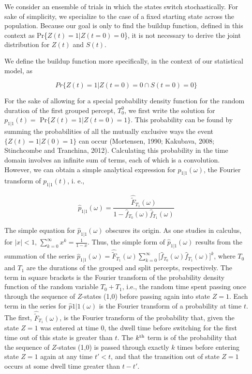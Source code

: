 We consider an ensemble of trials in which the states switch stochastically. For sake of simplicity, we specialize to the case of a fixed starting state across the population. Because our goal is only to find the buildup function, defined in this context as Pr\{$Z(t)=1|Z(t=0)=0$\}, it is not necessary to derive the joint distribution for $Z(t)$ and $S(t)$.

We define the buildup function more specifically, in the context of our statistical model, as

\begin{equation}
Pr\{Z(t) = 1 | Z(t = 0) = 0 \cap S(t = 0) = 0\}
\label{eqn:BUF}
\end{equation}

For the sake of allowing for a special probability density function for the random duration of the first grouped percept, $T_0^0$, we first write the solution for $p_{1|1}(t)=$ Pr$\{Z(t)=1|Z(t=0)=1\}$. This probability can be found by summing the probabilities of all the mutually exclusive ways the event $\{Z(t)=1|Z(0)=1\}$  can occur (Mortensen, 1990; Kakubava, 2008; Stinchcombe and Tranchina, 2012). Calculating this probability in the time domain involves an infinite sum of terms, each of which is a convolution. However, we can obtain a simple analytical expression for $\hat{p}_{1|1} (\omega)$, the Fourier transform of $p_{1|1} (t)$, i. e.,

\begin{equation}{}
\hat{p}_{1|1}(\omega) = \frac{\hat{\tilde{F}}_{T_1}(\omega)}{1-\hat{f}_{T_0}(\omega)\hat{f}_{T_1}(\omega)}
\label{eqn:analBUF1}
\end{equation}

The simple equation for $\hat{p}_{1|1}(\omega)$ obscures its origin. As one studies in calculus, for $|{x}|<1$, $\sum_{k=0}^{\infty}{x^k}=\frac{1}{1-x}$. Thus, the simple form of $\hat{p}_{1|1}(\omega)$ results from the summation of the series $\hat{p}_{1|1}(\omega)=\hat{\tilde{F}}_{T_1}(\omega)\sum_{k=0}^{\infty}\big[\hat{f}_{T_0}(\omega)\hat{f}_{T_1}(\omega)\big]^k$, where $T_0$ and $T_1$ are the durations of the grouped and split percepts, respectively. The term in square brackets is the Fourier transform of the probability density function of the random variable $T_0 + T_1$, i.e., the random time spent passing once through the sequence of $Z$-states (1,0) before passing again into state $Z=1$. Each term in the series for $\hat{p}{1|1}(\omega)$ is the Fourier transform of a probability at time $t$. The first, $\hat{\tilde{F}}_{T_1}(\omega)$, is the Fourier transform of the probability that, given the state $Z=1$ was entered at time 0, the dwell time before switching for the first time out of this state is greater than $t$. The $k\textsuperscript{th}$ term is of the probability that the sequence of $Z$-states (1,0) is passed through exactly $k$ times before entering state $Z=1$ again at any time $t'<t$, and that the transition out of state $Z=1$ occurs at some dwell time greater than $t-t'$.

